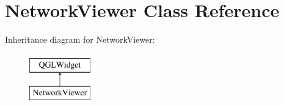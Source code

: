 \hypertarget{classNetworkViewer}{\section{Network\-Viewer Class Reference}
\label{classNetworkViewer}
}
Inheritance diagram for Network\-Viewer\-:\begin{figure}[H]
\begin{center}
\leavevmode
\includegraphics[height=2.000000cm]{classNetworkViewer}
\end{center}
\end{figure}
